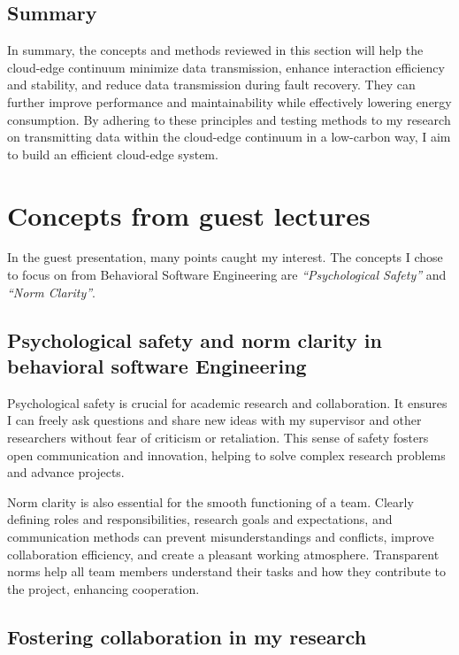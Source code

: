 \documentclass[11pt]{report}
\begin{document}
\section{Summary}
\label{sec:summary}

In summary, the concepts and methods reviewed in this section will help the cloud-edge continuum minimize data transmission, enhance interaction efficiency and stability, and reduce data transmission during fault recovery. They can further improve performance and maintainability while effectively lowering energy consumption. By adhering to these principles and testing methods to my research on transmitting data within the cloud-edge continuum in a low-carbon way, I aim to build an efficient cloud-edge system.


\chapter{Concepts from guest lectures}\label{chap:guests}

In the guest presentation, many points caught my interest. The concepts I chose to focus on from Behavioral Software Engineering are \textit{``Psychological Safety''} and \textit{``Norm Clarity''}.

\section{Psychological safety and norm clarity in behavioral software Engineering}\label{chap:concepts}

Psychological safety is crucial for academic research and collaboration. It ensures I can freely ask questions and share new ideas with my supervisor and other researchers without fear of criticism or retaliation. This sense of safety fosters open communication and innovation, helping to solve complex research problems and advance projects.

Norm clarity is also essential for the smooth functioning of a team. Clearly defining roles and responsibilities, research goals and expectations, and communication methods can prevent misunderstandings and conflicts, improve collaboration efficiency, and create a pleasant working atmosphere. Transparent norms help all team members understand their tasks and how they contribute to the project, enhancing cooperation.

\section{Fostering collaboration in my research}\label{chap:collaboration}
\end{document}
